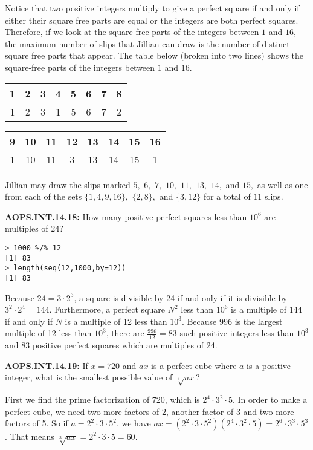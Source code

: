 \documentclass[11pt]{article}
\newenvironment{uzdevums}[1][\unskip]{%
\vspace{3mm}
\noindent
\textbf{#1:}
\noindent}
{}
\begin{document}
Notice that two positive integers multiply to give a perfect square if and only if either their square free parts are equal or the integers are both perfect squares. Therefore, if we look at the square free parts of the integers between $1$ and $16,$ the maximum number of slips that Jillian can draw is the number of distinct square free parts that appear. The table below (broken into two lines) shows the square-free parts of the integers between $1$ and $16.$ \begin{tabular}{cccccccc}
1 & 2 & 3 & 4 & 5 & 6 & 7 & 8 \\ \hline
1 & 2 & 3 & 1 & 5 & 6 & 7 & 2
\end{tabular}\begin{tabular}{cccccccc}
9 & 10 & 11 & 12 & 13 & 14 & 15 & 16 \\ \hline
1 & 10 & 11 & 3 & 13 & 14 & 15 & 1
\end{tabular} Jillian may draw the slips marked $5,$ $6,$ $7,$ $10,$ $11,$ $13,$ $14,$ and $15,$ as well as one from each of the sets $\{1,4,9,16\},$ $\{2,8\},$ and $\{3,12\}$ for a total of $\boxed{11}$ slips.



\begin{uzdevums}[AOPS.INT.14.18]
How many positive perfect squares less than $10^6$ are multiples of 24?
\end{uzdevums}



\begin{verbatim}
> 1000 %/% 12
[1] 83
> length(seq(12,1000,by=12))
[1] 83
\end{verbatim}

Because $24 = 3\cdot 2^3$, a square is divisible by 24 if and only if it is divisible by $3^2\cdot 2^4 = 144$. Furthermore, a perfect square $N^2$ less than $10^6$ is a multiple of 144 if and only if $N$ is a multiple of 12 less than $10^3$. Because 996 is the largest multiple of 12 less than $10^3$, there are $\frac{996}{12}= 83$ such positive integers less than $10^3$ and $\boxed{83}$ positive perfect squares which are multiples of 24.

\begin{uzdevums}[AOPS.INT.14.19]
If $x=720$ and $ax$ is a perfect cube where $a$ is a positive integer, what is the smallest possible value of $\sqrt[3]{ax}$?
\end{uzdevums}

First we find the prime factorization of 720, which is $2^4\cdot3^2\cdot 5$. In order to make a perfect cube, we need two more factors of 2, another factor of 3 and two more factors of 5. So if $a=2^2\cdot3\cdot5^2$, we have $ax=(2^2\cdot3\cdot5^2)(2^4\cdot3^2\cdot 5)=2^6\cdot3^3\cdot5^3$. That means $\sqrt[3]{ax}=2^2\cdot3\cdot5=\boxed{60}$.
\end{document}
